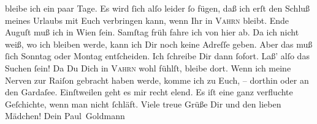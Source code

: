 \begin{ledgroupsized}[t]{13cm}
               bleibe ich ein paar Tage. Es wird ſich alſo leider ſo fügen, {\pb}daß ich erſt den Schluß meines Urlaubs mit Euch verbringen kann, wenn Ihr
               in \textsc{Vahrn} bleibt.  Ende Auguſt muß ich in Wien ſein. Samſtag{ }früh fahre ich von hier ab. Da ich nicht weiß, wo ich bleiben werde,
               kann ich Dir noch keine Adreſſe  geben. Aber das muß
               ſich Sonntag oder Montag entſcheiden. Ich ſchreibe Dir dann ſofort. Laß’ alſo das Suchen
               ſein! Da Du Dich in \textsc{Vahrn} wohl fühlſt, bleibe dort. Wenn ich meine Nerven zur Raiſon gebracht haben
               werde, komme ich zu Euch, –
                  dorthin oder an den Gardaſee. Einſtweilen geht es mir recht elend.
               Es iſt eine ganz verfluchte Geſchichte, wenn man nicht ſchläft. Viele treue Grüße Dir
               und den lieben Mädchen!\pend
           \pstart Dein \spacefill\mbox{Paul Goldmann}\pend{}
         
         \endnumbering{}\end{ledgroupsized}  \newcommand{\dateiname}{L03076}\newcommand{\titel}{Paul Goldmann an Arthur Schnitzler, 1. 8. [1901]}\newcommand{\editorInnen}{Martin Anton Müller und Laura Untner}
      